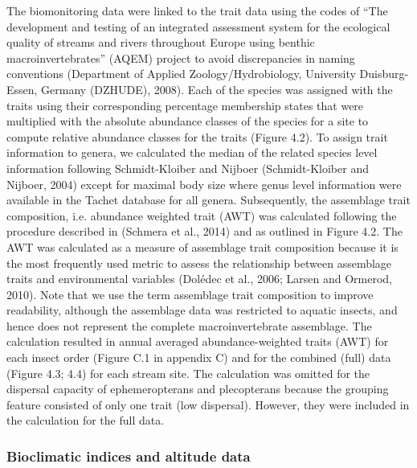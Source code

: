 The biomonitoring data were linked to the trait data using the codes of “The development and testing of an integrated assessment system for the ecological quality of streams and rivers throughout Europe using benthic macroinvertebrates” (AQEM) project to avoid discrepancies in naming conventions (Department of Applied Zoology/Hydrobiology, University Duisburg-Essen, Germany (DZHUDE), 2008). Each of the species was assigned with the  traits using their corresponding percentage membership states that were multiplied with the absolute abundance classes of the species for a site to compute relative abundance classes for the traits (Figure 4.2). To assign trait information to genera, we calculated the median of the related species level information following Schmidt-Kloiber and Nijboer (Schmidt-Kloiber and Nijboer, 2004) except for maximal body size where genus level information were available in the Tachet database for all genera. Subsequently, the assemblage trait composition, i.e. abundance weighted trait (AWT) was calculated following the procedure described in (Schmera et al., 2014) and as outlined in Figure 4.2. The AWT was calculated as a measure of assemblage trait composition because it is the most frequently used metric to assess the relationship between assemblage traits and environmental variables (Dolédec et al., 2006; Larsen and Ormerod, 2010). Note that we use the term assemblage trait composition to improve readability, although the assemblage data was restricted to aquatic insects, and hence does not represent the complete macroinvertebrate assemblage. The calculation resulted in annual averaged abundance-weighted traits (AWT) for each insect order (Figure C.1 in appendix C) and for the combined (full) data (Figure 4.3; 4.4) for each stream site. The calculation was omitted for the dispersal capacity of ephemeropterans and plecopterans because the grouping feature consisted of only one trait (low dispersal). However, they were included in the calculation for the full data.

\subsubsection{Bioclimatic indices and altitude data}
\label{Bioclimatic indices and altitude data}

